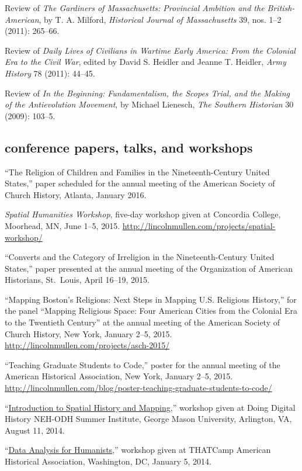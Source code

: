 \documentclass[11pt]{article}
\begin{document}
Review of \emph{The Gardiners of Massachusetts: Provincial Ambition and
  the British-American}, by T. A. Milford, \emph{Historical Journal of
  Massachusetts} 39, nos. 1--2 (2011): 265--66.

Review of \emph{Daily Lives of Civilians in Wartime Early America: From
  the Colonial Era to the Civil War}, edited by David S. Heidler and
Jeanne T. Heidler, \emph{Army History} 78 (2011): 44--45.

Review of \emph{In the Beginning: Fundamentalism, the Scopes Trial, and
  the Making of the Antievolution Movement}, by Michael Lienesch,
\emph{The Southern Historian} 30 (2009): 103--5.

\subsection{conference papers, talks, and
  workshops}\label{conference-papers-talks-and-workshops}

``The Religion of Children and Families in the Nineteenth-Century United 
States,'' paper scheduled for the annual meeting of the American Society of 
Church History, Atlanta, January 2016.

\emph{Spatial Humanities Workshop}, five-day workshop given at Concordia 
College, Moorhead, MN, June 1--5, 2015. 
\url{http://lincolnmullen.com/projects/spatial-workshop/}

``Converts and the Category of Irreligion in the Nineteenth-Century
United States,'' paper presented at the annual meeting of the
Organization of American Historians, St.~Louis, April 16--19, 2015.

``Mapping Boston's Religions: Next Steps in Mapping U.S. Religious History,'' 
for the panel ``Mapping Religious Space: Four American Cities from the 
Colonial Era to the Twentieth Century'' at the annual meeting of the American 
Society of Church History, New York, January 2--5, 2015.  
\url{http://lincolnmullen.com/projects/asch-2015/}

``Teaching Graduate Students to Code,'' poster for the annual meeting of the
American Historical Association, New York, January 2--5, 2015.
\url{http://lincolnmullen.com/blog/poster-teaching-graduate-students-to-code/}

``\href{/workshops/}{Introduction to Spatial History and Mapping},''
workshop given at Doing Digital History NEH-ODH Summer Institute, George
Mason University, Arlington, VA, August 11, 2014.

``\href{/workshops/}{Data Analysis for Humanists},'' workshop given at
THATCamp American Historical Association, Washington, DC, January 5,
2014.
\end{document}
